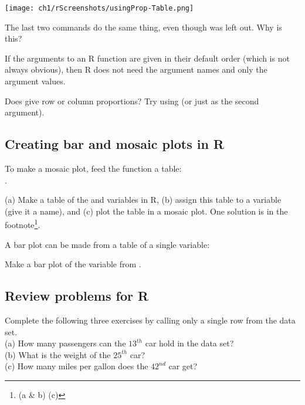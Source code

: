 \texttt{[image: ch1/rScreenshots/usingProp-Table.png]}
\rSSSpaceBottom

The last two commands do the same thing, even though  was left out. Why is this? \\

\begin{tipBox}{
If the arguments to an R function are given in their default order (which is not always obvious), then R does not need the argument names and only the argument values.}
\end{tipBox}

\begin{exercise}
Does  give row or column proportions? Try using  (or just  as the second argument).
\end{exercise}

\subsection{Creating bar and mosaic plots in R}

To make a mosaic plot, feed the function  a table: \\

.

\begin{exercise}
(a) Make a table of the  and  variables in R, (b) assign this table to a variable (give it a name), and (c) plot the table in a mosaic plot. One solution is in the footnote\footnote{(a \& b)  (c) }.
\end{exercise}

A bar plot can be made from a table of a single variable: \\


\begin{exercise}
Make a bar plot of the  variable from .
\end{exercise}

\subsection{Review problems for R}

\begin{exercise}
Complete the following three exercises by calling only a single row from the  data set. \\
(a) How many passengers can the $13^{th}$ car hold in the  data set? \\
(b) What is the weight of the $25^{th}$ car? \\
(c) How many miles per gallon does the $42^{nd}$ car get?
\end{exercise}

